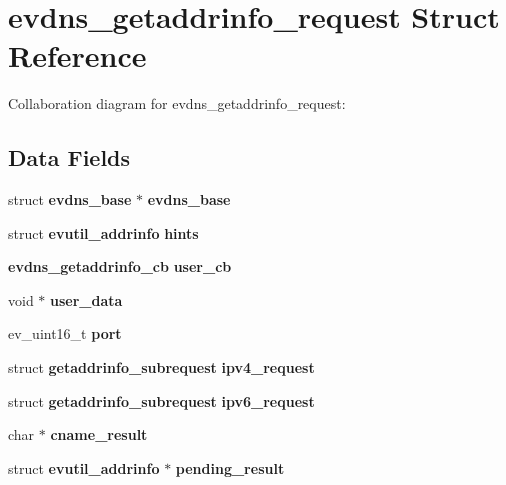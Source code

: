 \section{evdns\-\_\-getaddrinfo\-\_\-request \-Struct \-Reference}
\label{structevdns__getaddrinfo__request}


\-Collaboration diagram for evdns\-\_\-getaddrinfo\-\_\-request\-:
\subsection*{\-Data \-Fields}
\begin{DoxyCompactItemize}
\item 
struct {\bf evdns\-\_\-base} $\ast$ {\bfseries evdns\-\_\-base}\label{structevdns__getaddrinfo__request_a360bd23a115d2cfe0e93ea2030778d48}

\item 
struct {\bf evutil\-\_\-addrinfo} {\bfseries hints}\label{structevdns__getaddrinfo__request_ab8a1b6c0fa40a1de7c2dc82d14847d5c}

\item 
{\bf evdns\-\_\-getaddrinfo\-\_\-cb} {\bfseries user\-\_\-cb}\label{structevdns__getaddrinfo__request_a35383253f26c02f9d2554313eabf16f0}

\item 
void $\ast$ {\bfseries user\-\_\-data}\label{structevdns__getaddrinfo__request_a0f53d287ac7c064d1a49d4bd93ca1cb9}

\item 
ev\-\_\-uint16\-\_\-t {\bfseries port}\label{structevdns__getaddrinfo__request_ad57bef8b388c9980428975f9dec60e71}

\item 
struct {\bf getaddrinfo\-\_\-subrequest} {\bfseries ipv4\-\_\-request}\label{structevdns__getaddrinfo__request_a079adc6d33bccd9535d10fa3dcbccd23}

\item 
struct {\bf getaddrinfo\-\_\-subrequest} {\bfseries ipv6\-\_\-request}\label{structevdns__getaddrinfo__request_a405d06e774275a7cf177a2503e9f0bcc}

\item 
char $\ast$ {\bfseries cname\-\_\-result}\label{structevdns__getaddrinfo__request_aba22fb38b6567b9562be7f4418c704f0}

\item 
struct {\bf evutil\-\_\-addrinfo} $\ast$ {\bfseries pending\-\_\-result}\label{structevdns__getaddrinfo__request_ab138c0efb49c00ef83e49431a307c014}


\end{DoxyCompactItemize}
